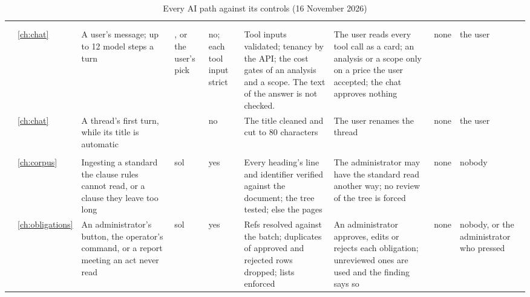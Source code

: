 \begin{landscape}
\setlength{\tabcolsep}{3pt}
\begin{xltabular}{\linewidth}{@{}>{\scriptsize}L{31mm}>{\scriptsize}L{6mm}>{\scriptsize}L{36mm}>{\scriptsize}L{15mm}>{\scriptsize}L{9mm}>{\scriptsize}Y>{\scriptsize}L{38mm}>{\scriptsize}L{19mm}>{\scriptsize}L{25mm}@{}}
\caption{Every AI path against its controls (16 November 2026)}\label{tab:control:matrix}\\
\toprule
{} &  &  &  &  &  &  &  &  \\
\midrule
\endfirsthead
\toprule
{} &  &  &  &  &  &  &  &  \\
\midrule
\endhead
\bottomrule
\endlastfoot
{} \\
 & \ref{ch:chat} & A user's message; up to 12 model steps a turn & , or the user's pick & no; each tool input strict & Tool inputs validated; tenancy by the API; the cost gates of an analysis and a scope. The text of the answer is not checked. & The user reads every tool call as a card; an analysis or a scope only on a price the user accepted; the chat approves nothing & none & the user \\
 & \ref{ch:chat} & A thread's first turn, while its title is automatic &  & no & The title cleaned and cut to 80 characters & The user renames the thread & none & the user \\
\midrule
{} \\
 & \ref{ch:corpus} & Ingesting a standard the clause rules cannot read, or a clause they leave too long & sol & yes & Every heading's line and identifier verified against the document; the tree tested; else the pages & The administrator may have the standard read another way; no review of the tree is forced & none & nobody \\
 & \ref{ch:obligations} & An administrator's button, the operator's command, or a report meeting an act never read & sol & yes & Refs resolved against the batch; duplicates of approved and rejected rows dropped; lists enforced & An administrator approves, edits or rejects each obligation; unreviewed ones are used and the finding says so & none & nobody, or the administrator who pressed \\

\end{xltabular}
\end{landscape}
